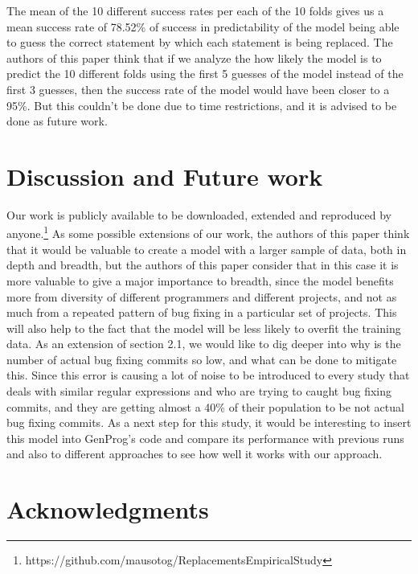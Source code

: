 \documentclass{sig-alternate-05-2015}
\begin{document}
The mean of the 10 different success rates per each of the 10 folds gives us a mean success rate of 78.52\% of success in predictability of the model being able to guess the correct statement by which each statement is being replaced.  
The authors of this paper think that if we analyze the how likely the model is to predict the 10 different folds using the first 5 guesses of the model instead of the first 3 guesses, then the success rate of the model would have been closer to a 95\%. But this couldn't be done due to time restrictions, and it is advised to be done as future work.





\section{Discussion and Future work}
Our work is publicly available to be downloaded, extended and reproduced by anyone.\footnote{https://github.com/mausotog/ReplacementsEmpiricalStudy}
As some possible extensions of our work, the authors of this paper think that it would be valuable to create a model with a larger sample of data, both in depth and breadth, but the authors of this paper consider that in this case it is more valuable to give a major importance to breadth, since the model benefits more from diversity of different programmers and different projects, and not as much from a repeated pattern of bug fixing in a particular set of projects. This will also help to the fact that the model will be less likely to overfit the training data.
As an extension of section 2.1, we would like to dig deeper into why is the number of actual bug fixing commits so low, and what can be done to mitigate this. Since this error is causing a lot of noise to be introduced to every study that deals with similar regular expressions and who are trying to caught bug fixing commits, and they are getting almost a 40\% of their population to be not actual bug fixing commits.
As a next step for this study, it would be interesting to insert this model into GenProg's code and compare its performance with previous runs and also to different approaches to see how well it works with our approach.


\section{Acknowledgments}



%
%



\end{document}
